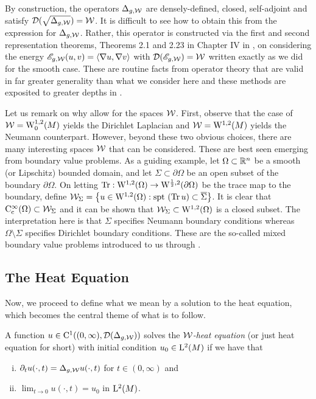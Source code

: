\documentclass[a4paper, 12pt]{amsart}
\begin{document}
By construction, the  operators $\Delta_{g,\cW}$ 
are densely-defined, closed, self-adjoint and satisfy 
$\dom(\sqrt{\Delta_{g,\cW}}) = \cW$.
It is difficult to see how to obtain this from the expression for $\Delta_{g,\cW}$.
Rather, this operator is constructed via the first and second representation 
theorems, Theorems 2.1 and 2.23 in Chapter IV in \cite{Kato}, on considering the   
energy $\sE_{g,\cW}(u,v) = \inprod{\nabla u, \nabla v}$ 
with $\dom(\sE_{g,\cW}) = \cW$ written exactly as we did for the smooth case.
These are routine facts from operator theory that are valid in far greater generality 
than what we consider here and these methods are exposited to 
greater depths in \cite{Yosida, Kato}.
 
Let us remark on why allow for the spaces \(\cW\). First, observe that the case of $\cW = \SobH[0]{1}(M)$
yields the Dirichlet Laplacian
and $\cW = \SobH{1}(M)$ yields the Neumann counterpart.
However, beyond these two obvious choices, 
there are many interesting spaces $\cW$ that
can be considered. These are best
seen emerging from boundary value problems.
As a guiding example, let $\Omega \subset \R^n$
be a smooth (or Lipschitz) bounded domain, and let $\Sigma \subset \partial \Omega$
be an open subset of the boundary $\partial \Omega$.
On letting $\Tr: \SobH{1}(\Omega) \to \SobH{\frac{1}{2}}(\partial \Omega)$
be the trace map to the boundary, define 
$\cW_{\Sigma} = \set{u \in \SobH{1}(\Omega): \spt (\Tr u) \subset \close{\Sigma}}$. 
It is clear that $\Ck[c]{\infty}(\Omega) \subset \cW_{\Sigma}$ and
it can be shown that $\cW_{\Sigma} \subset \SobH{1}(\Omega)$
is a closed subset. 
The interpretation here is that $\Sigma$ specifies Neumann boundary conditions whereas $\Omega \setminus \Sigma$
specifies Dirichlet boundary conditions. 
These are the so-called mixed boundary value problems 
introduced to us through \cite{AKM2}.

\subsection{The Heat Equation}

Now, we proceed to define what we mean by a solution to the heat
equation, which becomes the central theme of what is to follow.

\begin{defn}
A function \(u \in \Ck{1}((0,\infty),  \dom(\Delta_{g,\cW}))\) solves the \emph{\(\cW\)-heat equation} (or just heat equation for short) with initial condition $u_0 \in \Lp{2}(M)$ if we have that
\begin{enumerate}[(i)]
\item  $\partial_t u (\cdot, t) = \Delta_{g,\cW} u(\cdot, t)$ for $t \in (0, \infty)$ and 
\item $\lim_{t \to 0} u(\cdot, t) = u_0$ in $\Lp{2}(M)$.
\end{enumerate}
\end{defn}
\end{document}
